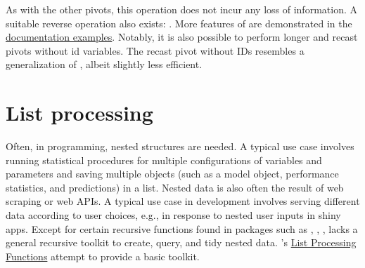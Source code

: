 \documentclass[article]{jss}
\newcommand{\fct}[1]{\code{#1()}}
\begin{document}
%
As with the other pivots, this operation does not incur any loss of information. A suitable reverse operation also exists: . More features of \fct{pivot} are demonstrated in the \href{https://sebkrantz.github.io/collapse/reference/pivot.html#ref-examples}{documentation examples}. Notably, it is also possible to perform longer and recast pivots without id variables. The recast pivot without IDs resembles a generalization of , albeit slightly less efficient.
%
\section{List processing} \label{sec:list_proc}
%
Often, in programming, nested structures are needed. A typical use case involves running statistical procedures for multiple configurations of variables and parameters and saving multiple objects (such as a model object, performance statistics, and predictions) in a list. Nested data is also often the result of web scraping or web APIs. A typical use case in development involves serving different data according to user choices, e.g., in response to nested user inputs in shiny apps. Except for certain recursive functions found in packages such as , , ,  lacks a general recursive toolkit to create, query, and tidy nested data. 's \href{https://sebkrantz.github.io/collapse/reference/list-processing.html}{List Processing Functions} attempt to provide a basic toolkit. \newline
\end{document}
